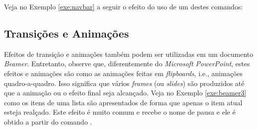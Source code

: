 Veja no Exemplo \ref{exe:navbar} a seguir o efeito do uso de um destes comandos:


\subsection{Transições e Animações}
\label{sec:trans_anima}

Efeitos de transição e animações também podem ser utilizadas em um documento \textit{Beamer}. Entretanto, observe que, diferentemente do \textit{Microsoft PowerPoint}, estes efeitos e animações são como as animações feitas em \textit{flipboards}, i.e., animações quadro-a-quadro. Isso significa que vários \textit{frames} (ou \textit{slides}) são produzidos até que a animação ou o efeito final seja alcançado. Veja no Exemplo \ref{exe:beamer3} como os itens de uma lista são apresentados de forma que apenas o item atual esteja realçado. Este efeito é muito comum e recebe o nome de pausa e ele é obtido a partir do comando \texttt{\pause}.


